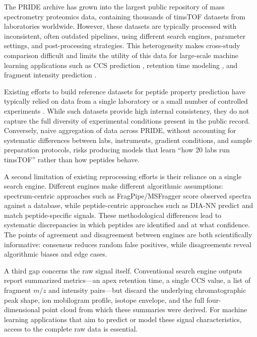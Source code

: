 \documentclass[10pt,twoside]{article}
\begin{document}
The PRIDE archive \cite{perez-riverol_pride_2022} has grown into the largest public repository of mass spectrometry proteomics data, containing thousands of timsTOF datasets from laboratories worldwide.
However, these datasets are typically processed with inconsistent, often outdated pipelines, using different search engines, parameter settings, and post-processing strategies.
This heterogeneity makes cross-study comparison difficult and limits the utility of this data for large-scale machine learning applications such as CCS prediction \cite{meier_deep_2021}, retention time modeling \cite{ma_deeprt_2018}, and fragment intensity prediction \cite{gessulat_prosit_2019}.

Existing efforts to build reference datasets for peptide property prediction have typically relied on data from a single laboratory or a small number of controlled experiments \cite{meier_deep_2021, zolg_building_2017}.
While such datasets provide high internal consistency, they do not capture the full diversity of experimental conditions present in the public record.
Conversely, naive aggregation of data across PRIDE, without accounting for systematic differences between labs, instruments, gradient conditions, and sample preparation protocols, risks producing models that learn ``how 20 labs run timsTOF'' rather than how peptides behave.

A second limitation of existing reprocessing efforts is their reliance on a single search engine.
Different engines make different algorithmic assumptions: spectrum-centric approaches such as FragPipe/MSFragger \cite{kong_msfragger_2017} score observed spectra against a database, while peptide-centric approaches such as DIA-NN \cite{demichev_diann_2020} predict and match peptide-specific signals.
These methodological differences lead to systematic discrepancies in which peptides are identified and at what confidence.
The points of agreement and disagreement between engines are both scientifically informative: consensus reduces random false positives, while disagreements reveal algorithmic biases and edge cases.

A third gap concerns the raw signal itself.
Conventional search engine outputs report summarized metrics---an apex retention time, a single CCS value, a list of fragment $m/z$ and intensity pairs---but discard the underlying chromatographic peak shape, ion mobilogram profile, isotope envelope, and the full four-dimensional point cloud from which these summaries were derived.
For machine learning applications that aim to predict or model these signal characteristics, access to the complete raw data is essential.
\end{document}

